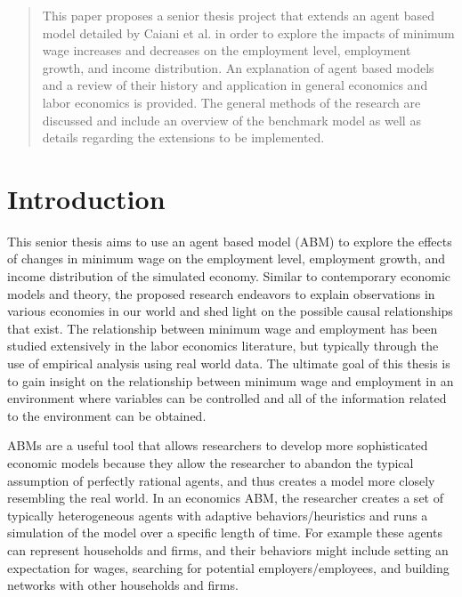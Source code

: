 \documentclass[11pt]{article}
\begin{document}
\begin{quote}

  This paper proposes a senior thesis project that extends an agent based model
  detailed by Caiani et al. in order to explore the impacts of minimum wage increases
  and decreases on the employment level, employment growth, and income distribution.
  An explanation of agent based models and a review of their history and application
  in general economics and labor economics is provided. The general methods of the
  research are discussed and include an overview of the benchmark model as well
  as details regarding the extensions to be implemented.
\end{quote}

\section{Introduction}
\label{sec:introduction}


This senior thesis aims to use an agent based model (ABM) to explore the effects
of changes in minimum wage on the employment level, employment growth, and income
distribution of the simulated economy.  Similar to contemporary economic models
and theory, the proposed research endeavors to explain observations in various
economies in our world and shed light on the possible causal relationships that
exist. The relationship between minimum wage and employment has been studied
extensively in the labor economics literature, but typically through the use
of empirical analysis using real world data. The ultimate goal of this thesis
is to gain insight on the relationship between minimum wage and employment in
an environment where variables can be controlled and all of the information
related to the environment can be obtained.

ABMs are a useful tool that allows researchers to develop more sophisticated
economic models because they allow the researcher to abandon the typical assumption
of perfectly rational agents, and thus creates a model more closely resembling
the real world. In an economics ABM,  the researcher creates a set of typically
 heterogeneous agents with adaptive behaviors/heuristics and runs a simulation
 of the model over a specific length of time. For example these agents can
 represent households and firms, and their behaviors might include setting an
 expectation for wages, searching for potential employers/employees, and building
 networks with other households and firms.
\end{document}
